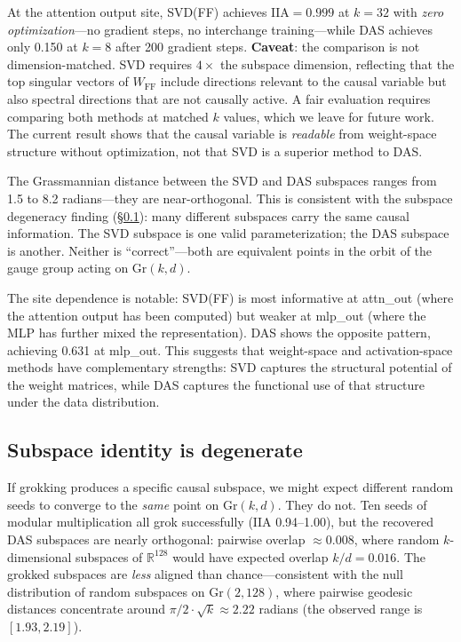 \documentclass{article}
\newcommand{\Gr}{\mathrm{Gr}}
\newcommand{\IIA}{\mathrm{IIA}}
\newcommand{\R}{\mathbb{R}}
\begin{document}
At the attention output site, SVD(FF) achieves $\IIA = 0.999$ at $k = 32$
with \emph{zero optimization}---no gradient steps, no interchange
training---while DAS achieves only 0.150 at $k = 8$ after 200 gradient
steps. \textbf{Caveat}: the comparison is not dimension-matched. SVD
requires $4\times$ the subspace dimension, reflecting that the top singular
vectors of $W_\text{FF}$ include directions relevant to the causal variable
but also spectral directions that are not causally active. A fair evaluation
requires comparing both methods at matched $k$ values, which we leave for
future work. The current result shows that the causal variable is
\emph{readable} from weight-space structure without optimization, not that
SVD is a superior method to DAS.

The Grassmannian distance between the SVD and DAS subspaces ranges from
1.5 to 8.2 radians---they are near-orthogonal. This is consistent with
the subspace degeneracy finding (\S\ref{sec:gauge_freedom}): many different
subspaces carry the same causal information. The SVD subspace is one
valid parameterization; the DAS subspace is another. Neither is
``correct''---both are equivalent points in the orbit of the gauge
group acting on $\Gr(k,d)$.

The site dependence is notable: SVD(FF) is most informative at attn\_out
(where the attention output has been computed) but weaker at mlp\_out
(where the MLP has further mixed the representation). DAS shows the
opposite pattern, achieving 0.631 at mlp\_out. This suggests that
weight-space and activation-space methods have complementary strengths:
SVD captures the structural potential of the weight matrices, while DAS
captures the functional use of that structure under the data distribution.

\subsection{Subspace identity is degenerate}
\label{sec:gauge_freedom}

If grokking produces a specific causal subspace, we might expect different
random seeds to converge to the \emph{same} point on $\Gr(k,d)$. They do
not. Ten seeds of modular multiplication all grok successfully ($\IIA$
0.94--1.00), but the recovered DAS subspaces are nearly orthogonal: pairwise
overlap $\approx 0.008$, where random $k$-dimensional subspaces of
$\R^{128}$ would have expected overlap $k/d = 0.016$. The grokked subspaces
are \emph{less} aligned than chance---consistent with the null distribution
of random subspaces on $\Gr(2, 128)$, where pairwise geodesic distances
concentrate around $\pi/2 \cdot \sqrt{k} \approx 2.22$ radians (the
observed range is $[1.93, 2.19]$).
\end{document}

